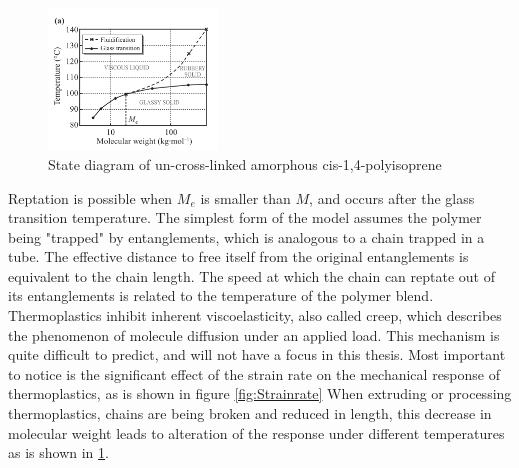 \begin{figure}[H]
    \centering
    \includegraphics[width=0.4\textwidth]{chapter_2/figures/polymerphases.PNG}
    \caption{State diagram of un-cross-linked amorphous cis-1,4-polyisoprene \cite{Halary2011PolymerMaterials}}
    \label{fig:polymerphase}
\end{figure}
Reptation is possible when $M_e$ is smaller than $M$, and occurs after the glass transition temperature. The simplest form of the model assumes the polymer being "trapped" by entanglements, which is analogous to a chain trapped in a tube. The effective distance to free itself from the original entanglements is equivalent to the chain length. The speed at which the chain can reptate out of its entanglements is related to the temperature of the polymer blend\cite{Halary2011PolymerMaterials}.  
Thermoplastics inhibit inherent viscoelasticity, also called creep, which describes the phenomenon of molecule diffusion under an applied load. This mechanism is quite difficult to predict, and will not have a focus in this thesis. Most important to notice is the significant effect of the strain rate on the mechanical response of thermoplastics, as is shown in figure \ref{fig:Strainrate}
When extruding or processing thermoplastics, chains are being broken and reduced in length, this decrease in molecular weight leads to alteration of the response under different temperatures as is shown in \ref{fig:polymerphase}.

